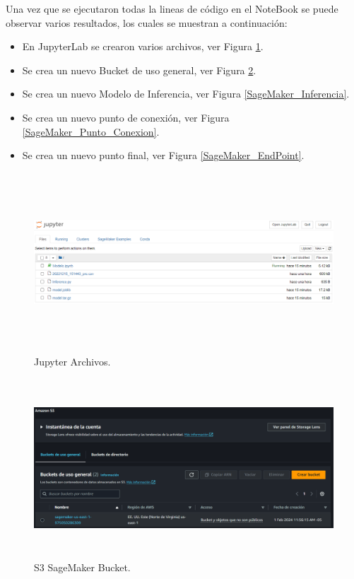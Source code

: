 \documentclass[a4paper,10pt, oneside, titlepage]{article}
\begin{document}
	\indent Una vez que se ejecutaron todas la lineas de código en el NoteBook se puede observar varios resultados, los cuales se muestran a continuación:
	\begin{itemize}
		\item En JupyterLab se crearon varios archivos, ver Figura \ref{Jupyter_Archivos}.
		\item Se crea un nuevo Bucket de uso general, ver Figura \ref{S3_SageMaker_Bucket}.
		\item Se crea un nuevo Modelo de Inferencia, ver Figura \ref{SageMaker_Inferencia}.
		\item Se crea un nuevo punto de conexión, ver Figura \ref{SageMaker_Punto_Conexion}.
		\item Se crea un nuevo punto final, ver Figura \ref{SageMaker_EndPoint}. 
	\end{itemize}
	\begin{figure}[!h]
		\centering
		\includegraphics[width = 1\linewidth, height = 6.7cm]{Jupyter_Archivos.png}
		\caption{Jupyter Archivos.}
		\label{Jupyter_Archivos}
	\end{figure}
	\begin{figure}[!h]
		\centering
		\includegraphics[width = 1\linewidth, height = 6.7cm]{S3_SageMaker_Bucket.png}
		\caption{S3 SageMaker Bucket.}
		\label{S3_SageMaker_Bucket}
	\end{figure}
\end{document}

